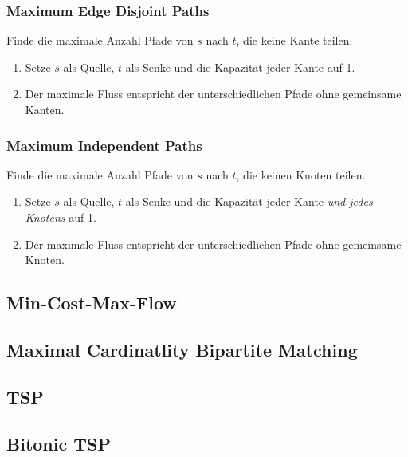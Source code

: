 \subsubsection{Maximum Edge Disjoint Paths}
Finde die maximale Anzahl Pfade von $s$ nach $t$, die keine Kante teilen.
\begin{enumerate}
	\item Setze $s$ als Quelle, $t$ als Senke und die Kapazität jeder Kante auf 1.
	\item Der maximale Fluss entspricht der unterschiedlichen Pfade ohne gemeinsame Kanten.
\end{enumerate}

\subsubsection{Maximum Independent Paths}
Finde die maximale Anzahl Pfade von $s$ nach $t$, die keinen Knoten teilen.
\begin{enumerate}
	\item Setze $s$ als Quelle, $t$ als Senke und die Kapazität jeder Kante \emph{und jedes Knotens} auf 1.
	\item Der maximale Fluss entspricht der unterschiedlichen Pfade ohne gemeinsame Knoten.
\end{enumerate}

\subsection{Min-Cost-Max-Flow}


\subsection{Maximal Cardinatlity Bipartite Matching}\label{kuhn}


\subsection{TSP}


\subsection{Bitonic TSP}


